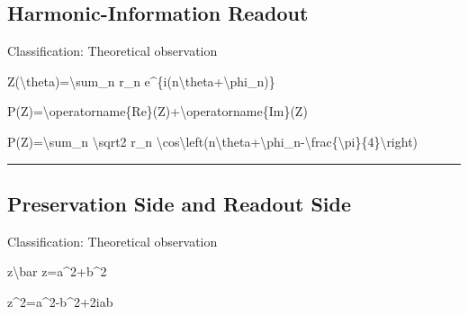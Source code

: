 \documentclass[
  a4paper]{article}
\newenvironment{Shaded}{}{}
\newcommand{\NormalTok}[1]{#1}
\begin{document}
\subsection{Harmonic-Information
Readout}\label{harmonic-information-readout}

Classification: Theoretical observation

\begin{Shaded}
\begin{Highlighting}[]
\NormalTok{Z(\textbackslash{}theta)=\textbackslash{}sum\_n r\_n e\^{}\{i(n\textbackslash{}theta+\textbackslash{}phi\_n)\}}
\end{Highlighting}
\end{Shaded}

\begin{Shaded}
\begin{Highlighting}[]
\NormalTok{P(Z)=\textbackslash{}operatorname\{Re\}(Z)+\textbackslash{}operatorname\{Im\}(Z)}
\end{Highlighting}
\end{Shaded}

\begin{Shaded}
\begin{Highlighting}[]
\NormalTok{P(Z)=\textbackslash{}sum\_n \textbackslash{}sqrt2 r\_n}
\NormalTok{\textbackslash{}cos\textbackslash{}left(n\textbackslash{}theta+\textbackslash{}phi\_n{-}\textbackslash{}frac\{\textbackslash{}pi\}\{4\}\textbackslash{}right)}
\end{Highlighting}
\end{Shaded}

\begin{center}\rule{0.5\linewidth}{0.5pt}\end{center}

\subsection{Preservation Side and Readout
Side}\label{preservation-side-and-readout-side}

Classification: Theoretical observation

\begin{Shaded}
\begin{Highlighting}[]
\NormalTok{z\textbackslash{}bar z=a\^{}2+b\^{}2}
\end{Highlighting}
\end{Shaded}

\begin{Shaded}
\begin{Highlighting}[]
\NormalTok{z\^{}2=a\^{}2{-}b\^{}2+2iab}
\end{Highlighting}
\end{Shaded}
\end{document}
